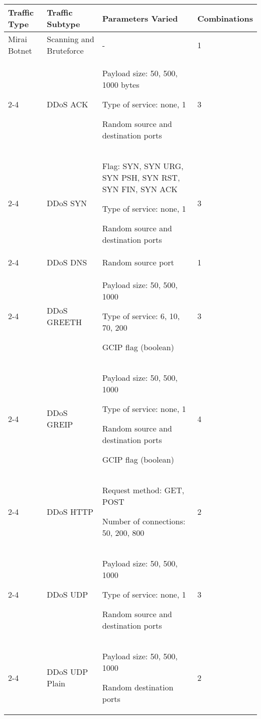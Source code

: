 \documentclass[lettersize,journal]{IEEEtran}
\begin{document}
\begin{table*}[t]
\centering
\caption{Comprehensive summary of the tools, parameters, and methods used to generate Mirai Botnet traffic type.}\label{tab:mirai_params}
\begin{tabularx}{\textwidth}{@{}l>{\hsize=3.5cm}XX>{\hsize=1.75cm}X@{}}
\toprule
\textbf{Traffic Type} & \textbf{Traffic Subtype}& \textbf{Parameters Varied} & \textbf{Combinations} \\
\midrule
Mirai Botnet 
 & Scanning and Bruteforce & - & 1 \\ 
\cmidrule{2-4}
 & DDoS ACK &   Payload size: 50, 500, 1000 bytes\par{}  Type of service: none, 1\par{}  Random source and destination ports & 3 \\ 
\cmidrule{2-4}
 & DDoS SYN &   Flag: SYN, SYN URG, SYN PSH, SYN RST, SYN FIN, SYN ACK\par{}  Type of service: none, 1\par{}  Random source and destination ports & 3 \\ 
\cmidrule{2-4}
 & DDoS DNS &   Random source port & 1 \\ 
\cmidrule{2-4}
 & DDoS GREETH &   Payload size: 50, 500, 1000\par{}  Type of service: 6, 10, 70, 200\par{}  GCIP flag (boolean) & 3 \\ 
\cmidrule{2-4}
 & DDoS GREIP &   Payload size: 50, 500, 1000\par{}  Type of service: none, 1\par{}  Random source and destination ports\par{}  GCIP flag (boolean) & 4 \\ 
\cmidrule{2-4}
 & DDoS HTTP &  Request method: GET, POST\par{}  Number of connections: 50, 200, 800 & 2 \\ 
\cmidrule{2-4}
 & DDoS UDP &  Payload size: 50, 500, 1000\par{}  Type of service: none, 1\par{}  Random source and destination ports & 3 \\ 
\cmidrule{2-4}
 & DDoS UDP Plain &  Payload size: 50, 500, 1000\par{}  Random destination ports & 2 \\
\bottomrule
\end{tabularx}
\end{table*} 
 
\end{document}
